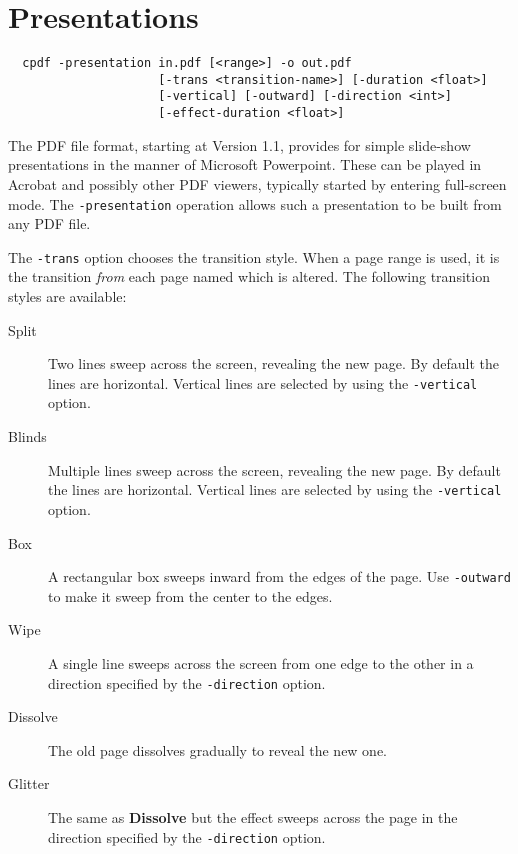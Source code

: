 \documentclass{book}
\begin{document}
\chapter{Presentations}\label{chap:7}\pagestyle{fancy}
  \begin{framed}
  \small\noindent\begin{verbatim}
  cpdf -presentation in.pdf [<range>] -o out.pdf
                     [-trans <transition-name>] [-duration <float>]
                     [-vertical] [-outward] [-direction <int>]
                     [-effect-duration <float>]\end{verbatim}
\end{framed}

  \vspace{12mm}
The PDF file format, starting at Version 1.1, provides for simple slide-show
presentations in the manner of Microsoft Powerpoint. These can be played in
Acrobat and possibly other PDF viewers, typically started by entering
full-screen mode. The \texttt{-presentation} operation allows such a
presentation to be built from any PDF file.

The \texttt{-trans} option chooses the transition style. When a page range is
used, it is the transition \textit{from} each page named which is altered. The
following transition styles are available:

\begin{description}
  \item[Split]Two lines sweep across the screen, revealing the new page. By
default the lines are horizontal. Vertical lines are selected by using the
\texttt{-vertical} option.
  \item[Blinds]Multiple lines sweep across the screen, revealing the new page.
By default the lines are horizontal. Vertical lines are selected by using the
\texttt{-vertical} option.
  \item[Box]A rectangular box sweeps inward from the edges of the page. Use
\texttt{-outward} to make it sweep from the center to the edges.
  \item[Wipe]A single line sweeps across the screen from one edge to the other
in a direction specified by the \texttt{-direction} option.
  \item[Dissolve]The old page dissolves gradually to reveal the new one.
  \item[Glitter]The same as \textbf{Dissolve} but the effect sweeps across the
page in the direction specified by the \texttt{-direction} option.
\end{description}
\end{document}
